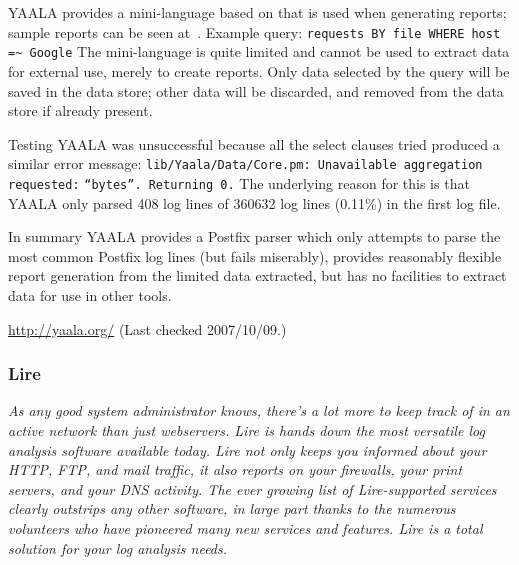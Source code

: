YAALA provides a mini-language based on \SQL{} that is used when generating
reports; sample reports can be seen at~\cite{yaala-samples}.  Example
query: \newline \tab{} \texttt{requests BY file WHERE host =\~{} Google}
\newline The mini-language is quite limited and cannot be used to extract
data for external use, merely to create reports.  Only data selected by the
query will be saved in the data store; other data will be discarded, and
removed from the data store if already present.

Testing YAALA was unsuccessful because all the select clauses tried
produced a similar error message:
\newline\tab{}\texttt{lib/Yaala/Data/Core.pm: Unavailable aggregation
requested:} \newline\tab{}\texttt{``bytes''. Returning 0.} \newline  The
underlying reason for this is that YAALA only parsed 408 log lines of
360632 log lines (0.11\%) in the first log file.

In summary YAALA provides a Postfix parser which only attempts to parse the
most common Postfix log lines (but fails miserably), provides reasonably
flexible report generation from the limited data extracted, but has no
facilities to extract data for use in other tools.

\url{http://yaala.org/} \newline (Last checked 2007/10/09.)

\subsubsection{Lire}

\textit{As any good system administrator knows, there's a lot more to keep
track of in an active network than just webservers. Lire is hands down the
most versatile log analysis software available today. Lire not only keeps
you informed about your HTTP, FTP, and mail traffic, it also reports on
your firewalls, your print servers, and your DNS activity. The ever growing
list of Lire-supported services clearly outstrips any other software, in
large part thanks to the numerous volunteers who have pioneered many new
services and features. Lire is a total solution for your log analysis
needs.\/}

